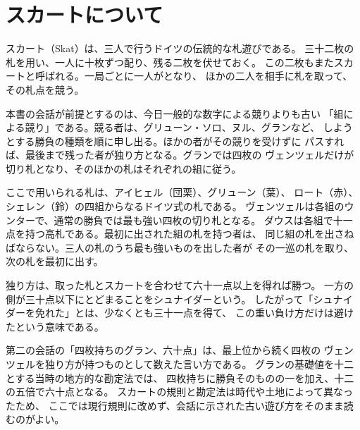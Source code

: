 
\section*{スカートについて}

\begin{japanese}
スカート（\textgerman{Skat}）は、三人で行うドイツの伝統的な札遊びである。
三十二枚の札を用い、一人に十枚ずつ配り、残る二枚を伏せておく。
この二枚もまたスカートと呼ばれる。一局ごとに一人がとなり、
ほかの二人を相手に札を取って、その札点を競う。

本書の会話が前提とするのは、今日一般的な数字による競りよりも古い
「組による競り」である。競る者は、グリューン・ソロ、ヌル、グランなど、
しようとする勝負の種類を順に申し出る。ほかの者がその競りを受けずに
パスすれば、最後まで残った者が独り方となる。グランでは四枚の
ヴェンツェルだけが切り札となり、そのほかの札はそれぞれの組に従う。

ここで用いられる札は、アイヒェル（団栗）、グリューン（葉）、
ロート（赤）、シェレン（鈴）の四組からなるドイツ式の札である。
ヴェンツェルは各組のウンターで、通常の勝負では最も強い四枚の切り札となる。
ダウスは各組で十一点を持つ高札である。最初に出された組の札を持つ者は、
同じ組の札を出さねばならない。三人の札のうち最も強いものを出した者が
その一巡の札を取り、次の札を最初に出す。

独り方は、取った札とスカートを合わせて六十一点以上を得れば勝つ。
一方の側が三十点以下にとどまることをシュナイダーという。
したがって「シュナイダーを免れた」とは、少なくとも三十一点を得て、
この重い負け方だけは避けたという意味である。

第二の会話の「四枚持ちのグラン、六十点」は、最上位から続く四枚の
ヴェンツェルを独り方が持つものとして数えた言い方である。
グランの基礎値を十二とする当時の地方的な勘定法では、
四枚持ちに勝負そのものの一を加え、十二の五倍で六十点となる。
スカートの規則と勘定法は時代や土地によって異なったため、
ここでは現行規則に改めず、会話に示された古い遊び方をそのまま読むのがよい。
\end{japanese}
